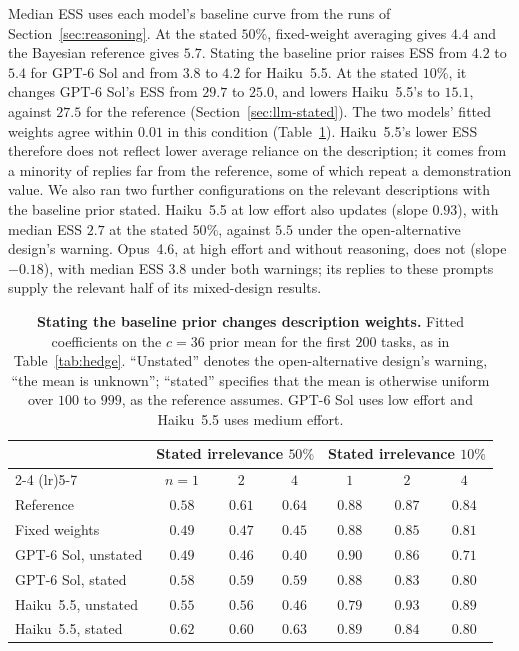 Median ESS uses each model's baseline curve from the runs of Section~\ref{sec:reasoning}. At the stated $50\%$, fixed-weight averaging gives $4.4$ and the Bayesian reference gives $5.7$. Stating the baseline prior raises ESS from $4.2$ to $5.4$ for GPT-6 Sol and from $3.8$ to $4.2$ for Haiku~5.5. At the stated $10\%$, it changes GPT-6 Sol's ESS from $29.7$ to $25.0$, and lowers Haiku~5.5's to $15.1$, against $27.5$ for the reference (Section~\ref{sec:llm-stated}). The two models' fitted weights agree within $0.01$ in this condition (Table~\ref{tab:fallback}). Haiku~5.5's lower ESS therefore does not reflect lower average reliance on the description; it comes from a minority of replies far from the reference, some of which repeat a demonstration value. We also ran two further configurations on the relevant descriptions with the baseline prior stated. Haiku~5.5 at low effort also updates (slope $0.93$), with median ESS $2.7$ at the stated $50\%$, against $5.5$ under the open-alternative design's warning. Opus~4.6, at high effort and without reasoning, does not (slope $-0.18$), with median ESS $3.8$ under both warnings; its replies to these prompts supply the relevant half of its mixed-design results.

\begin{table}[htbp]
\centering\small
\setlength{\tabcolsep}{3pt}
\caption[Stating the baseline prior changes description weights]{\textbf{Stating the baseline prior changes description weights.} Fitted coefficients on the $c=36$ prior mean for the first $200$ tasks, as in Table~\ref{tab:hedge}. ``Unstated'' denotes the open-alternative design's warning, ``the mean is unknown''; ``stated'' specifies that the mean is otherwise uniform over $100$ to $999$, as the reference assumes. GPT-6 Sol uses low effort and Haiku~5.5 uses medium effort.}
\label{tab:fallback}
\vspace{3pt}
\begin{tabular}{lcccccc}
\toprule
& \multicolumn{3}{c}{Stated irrelevance $50\%$} & \multicolumn{3}{c}{Stated irrelevance $10\%$} \\
\cmidrule(lr){2-4} \cmidrule(lr){5-7}
& $n=1$ & $2$ & $4$ & $1$ & $2$ & $4$ \\
\midrule
Reference & $0.58$ & $0.61$ & $0.64$ & $0.88$ & $0.87$ & $0.84$ \\
Fixed weights &$0.49$ & $0.47$ & $0.45$ & $0.88$ & $0.85$ & $0.81$ \\
GPT-6 Sol, unstated & $0.49$ & $0.46$ & $0.40$ & $0.90$ & $0.86$ & $0.71$ \\
GPT-6 Sol, stated & $0.58$ & $0.59$ & $0.59$ & $0.88$ & $0.83$ & $0.80$ \\
Haiku~5.5, unstated & $0.55$ & $0.56$ & $0.46$ & $0.79$ & $0.93$ & $0.89$ \\
Haiku~5.5, stated & $0.62$ & $0.60$ & $0.63$ & $0.89$ & $0.84$ & $0.80$ \\
\bottomrule
\end{tabular}
\end{table}

